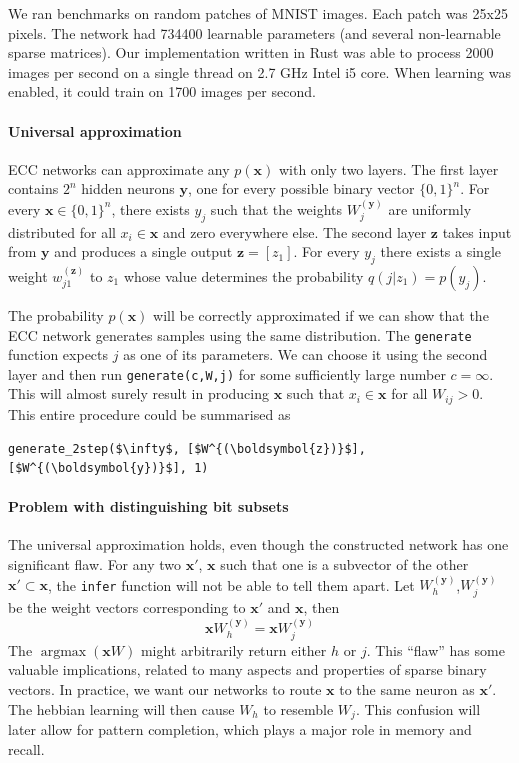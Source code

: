 \documentclass[12pt]{article}
\DeclareMathOperator*{\argmax}{argmax}
\begin{document}
We ran benchmarks on random patches of MNIST images. Each patch was 25x25 pixels. The network had 734400 learnable parameters (and several non-learnable sparse matrices). Our implementation written in Rust was able to process 2000 images per second on a single thread on 2.7 GHz Intel i5 core. When learning was enabled, it could train on 1700 images per second.


\paragraph{Universal approximation}

ECC networks can approximate any $p(\boldsymbol{x})$ with only two layers. The first layer contains $2^n$ hidden neurons $\boldsymbol{y}$, one for every possible binary vector $\{0,1\}^n$. For every $\boldsymbol{x} \in \{0,1\}^n$, there exists $y_j$ such that the weights $W_j^{(\boldsymbol{y})}$ are uniformly distributed for all $x_i \in \boldsymbol{x}$ and zero everywhere else. The second layer $\boldsymbol{z}$ takes input from $\boldsymbol{y}$ and produces a single output $\boldsymbol{z}=[z_1]$. For every $y_j$ there exists a single weight $w_{j1}^{(\boldsymbol{z})}$ to $z_1$ whose value determines the probability $q(j|z_1)=p(y_j)$. 

The probability $p(\boldsymbol{x})$ will be correctly approximated if we can show that the ECC network generates samples using the same distribution. The \texttt{generate} function expects $j$ as one of its parameters. We can choose it using the second layer and then run \texttt{generate(c,W,j)} for some sufficiently large number $c=\infty$. This will almost surely result in producing  $\boldsymbol{x}$ such that $x_i\in \boldsymbol{x}$ for all $W_{ij}>0$. This entire procedure could be summarised as 
\begin{lstlisting}
generate_2step($\infty$, [$W^{(\boldsymbol{z})}$], [$W^{(\boldsymbol{y})}$], 1)
\end{lstlisting}

\paragraph{Problem with distinguishing bit subsets} The universal approximation holds, even though the constructed network has one significant flaw. For any two $\boldsymbol{x}'$, $\boldsymbol{x}$ such that one is a subvector of the other $\boldsymbol{x}'\subset \boldsymbol{x}$, the \texttt{infer} function will not be able to tell them apart. Let $W_h^{(\boldsymbol{y})}$,$W_j^{(\boldsymbol{y})}$ be the weight vectors corresponding to $\boldsymbol{x}'$ and $\boldsymbol{x}$, then
\[\boldsymbol{x}W_h^{(\boldsymbol{y})}=\boldsymbol{x}W_j^{(\boldsymbol{y})}
\] 
The $\argmax(\boldsymbol{x}W)$ might arbitrarily return either $h$ or $j$. This ``flaw'' has some valuable implications, related to many aspects and properties of sparse binary vectors. In practice, we want our networks to route $\boldsymbol{x}$ to the same neuron as $\boldsymbol{x}'$.  The hebbian learning will then cause $W_h$ to resemble $W_j$. This confusion will later allow for pattern completion, which plays a major role in memory and recall. 
\end{document}
